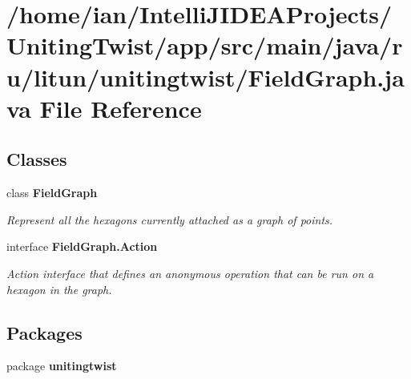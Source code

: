 \section{/home/ian/\+Intelli\+J\+I\+D\+E\+A\+Projects/\+Uniting\+Twist/app/src/main/java/ru/litun/unitingtwist/\+Field\+Graph.java File Reference}
\label{_field_graph_8java}
\subsection*{Classes}
\begin{DoxyCompactItemize}
\item 
class \textbf{ Field\+Graph}
\begin{DoxyCompactList}\small\item\em Represent all the hexagons currently attached as a graph of points. \end{DoxyCompactList}\item 
interface {\bfseries Field\+Graph.\+Action}
\begin{DoxyCompactList}\small\item\em Action interface that defines an anonymous operation that can be run on a hexagon in the graph. \end{DoxyCompactList}\end{DoxyCompactItemize}
\subsection*{Packages}
\begin{DoxyCompactItemize}
\item 
package \textbf{ unitingtwist}
\end{DoxyCompactItemize}
